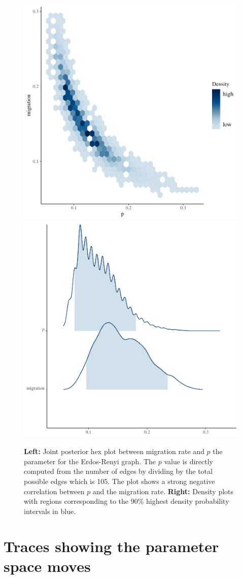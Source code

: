 \documentclass[11pt,a4paper]{article}
\numberwithin{equation}{section}
\begin{document}
\begin{figure}
\includegraphics[width=0.5\linewidth]{thesis_draft_files/figure-latex/unnamed-chunk-11-1} \includegraphics[width=0.5\linewidth]{thesis_draft_files/figure-latex/unnamed-chunk-11-2} \caption{\label{fig:p_mig_pairs} \textbf{Left:} Joint posterior hex plot between migration rate and $p$ the parameter for the Erdos-Renyi graph. The $p$ value is directly computed from the number of edges by dividing by the total possible edges which is 105. The plot shows a strong negative correlation between $p$ and the migration rate.  \textbf{Right:} Density plots with regions corresponding to the 90\% highest density probability intervals in blue. }\label{fig:unnamed-chunk-11}
\end{figure}

\hypertarget{traces-showing-the-parameter-space-moves}{%
\section{Traces showing the parameter space
moves}\label{traces-showing-the-parameter-space-moves}}

\end{document}
